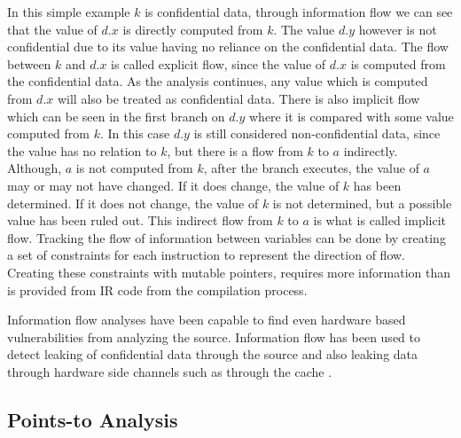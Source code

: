 In this simple example $k$ is confidential data, through information flow we
can see that the value of $d.x$ is directly computed from $k$. The value $d.y$
however is not confidential due to its value having no reliance on the
confidential data. The flow between $k$ and $d.x$ is called explicit flow,
since the value of $d.x$ is computed from the confidential data. As the
analysis continues, any value which is computed from $d.x$ will also be
treated as confidential data. There is also implicit flow which can be seen in
the first branch on $d.y$ where it is compared with some value computed from
$k$. In this case $d.y$ is still considered non-confidential data, since the
value has no relation to $k$, but there is a flow from $k$ to $a$ indirectly.
Although, $a$ is not computed from $k$, after the branch executes, the value
of $a$ may or may not have changed. If it does change, the value of $k$ has been
determined. If it does not change, the value of $k$ is not determined, but a
possible value has been ruled out. This indirect flow from $k$ to $a$ is what
is called implicit flow. Tracking the flow of information between variables can
be done by creating a set of constraints for each instruction to represent the
direction of flow. Creating these constraints with mutable pointers, requires
more information than is provided from IR code from the compilation process.

Information flow analyses have been capable to find even hardware based
vulnerabilities from analyzing the source. Information flow has been used to
detect leaking of confidential data through the source and also leaking data
through hardware side channels such as through the cache
\cite{DBLP:journals/corr/DoychevK16}.

\subsection{Points-to Analysis}


